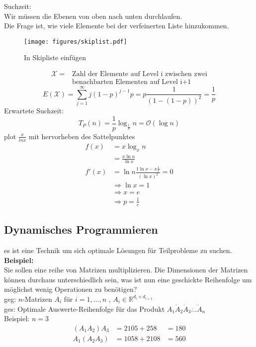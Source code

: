 \documentclass[a4paper,draft,twoside,10pt]{report}
\begin{document}
Suchzeit:\\
Wir müssen die Ebenen von oben nach unten durchlaufen.\\
Die Frage ist, wie viele Elemente bei der verfeinerten Liste hinzukommen.\\
\begin{figure}[H]\center
\texttt{[image: figures/skiplist.pdf]}
\caption{In Skipliste einfügen}
\end{figure}
\begin{align*}\mathcal X = &\mbox{Zahl der Elemente auf Level i zwischen zwei}\\&\mbox{benachbarten Elementen auf Level i+1}\end{align*}
\[E(\mathcal X)=\sum_{j=1}^\infty j(1-p)^{j-1}p=p\frac{1}{(1-(1-p))^2}=\frac{1}{p}\]
Erwartete Suchzeit:
\[T_P(n)=\frac{1}{p}\log_\frac{1}{P}n=\mathcal O (\log n)\]
plot $\frac{x}{ln x}$ mit hervorheben des Sattelpunktes
\begin{align*}
f(x)&=x\log_xn\\
&=\frac{x\ln n}{\ln x}\\
f'(x)&=\ln n \frac{1\ln x -x\frac{1}{x}}{(\ln x)^2}=0\\
&\Rightarrow \ln x = 1\\
&\Rightarrow x=e \\
&\Rightarrow p=\frac{1}{e}
\end{align*}

\subsection{Dynamisches Programmieren}
es ist eine Technik um sich optimale Lösungen für Teilprobleme zu suchen.\\
\textbf{Beispiel:}\\
Sie sollen eine reihe von Matrizen multiplizieren. Die Dimensionen der Matrizen können durchaus unterschiedlich sein, was ist nun eine geschickte Reihenfolge um möglichst wenig Operationen zu benötigen?\\
geg: $n$-Matrizen $A_i$ für $i=1,\hdots,n$ , $A_i\in\mathbb R^{d_i\times d_{i+1}}$\\
ges: Optimale Auswerte-Reihenfolge für das Produkt $A_1 \dot A_2 \dot A_3 \dot \hdots \dot A_n$\\
Beispiel: $n=3$\\
\begin{align*}
(A_1 A_2) A_3 &= 2 10 5 + 2 5 8 &=180\\
A_1 (A_2 A_3) &= 10 5 8 + 2 10 8&= 560
\end{align*}
\end{document}
